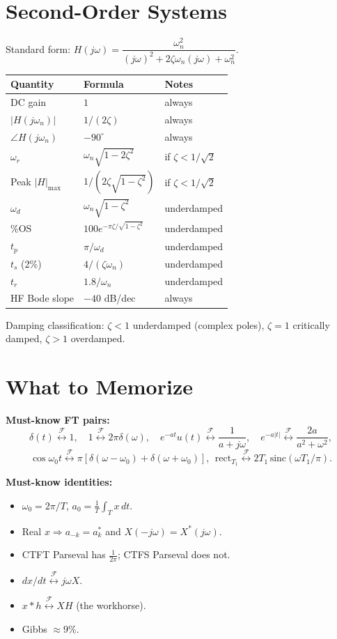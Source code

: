 \documentclass[11pt]{article}
\newcommand{\FT}{\overset{\mathcal{F}}{\longleftrightarrow}}
\begin{document}
\section{Second-Order Systems}

Standard form: $H(j\omega) = \dfrac{\omega_n^2}{(j\omega)^2+2\zeta\omega_n(j\omega)+\omega_n^2}.$

\begin{center}
\begin{tabular}{|l|l|l|}
\hline
Quantity & Formula & Notes\\
\hline
DC gain & $1$ & always\\
$|H(j\omega_n)|$ & $1/(2\zeta)$ & always\\
$\angle H(j\omega_n)$ & $-90^\circ$ & always\\
$\omega_r$ & $\omega_n\sqrt{1-2\zeta^2}$ & if $\zeta<1/\sqrt{2}$\\
Peak $|H|_{\max}$ & $1/(2\zeta\sqrt{1-\zeta^2})$ & if $\zeta<1/\sqrt{2}$\\
$\omega_d$ & $\omega_n\sqrt{1-\zeta^2}$ & underdamped\\
\%OS & $100 e^{-\pi\zeta/\sqrt{1-\zeta^2}}$ & underdamped\\
$t_p$ & $\pi/\omega_d$ & underdamped\\
$t_s$ (2\%) & $4/(\zeta\omega_n)$ & underdamped\\
$t_r$ & $1.8/\omega_n$ & underdamped\\
HF Bode slope & $-40$ dB/dec & always\\
\hline
\end{tabular}
\end{center}

Damping classification: $\zeta<1$ underdamped (complex poles), $\zeta=1$ critically damped, $\zeta>1$ overdamped.

\section{What to Memorize}

\textbf{Must-know FT pairs:}
\[ \delta(t) \FT 1,\quad 1 \FT 2\pi\delta(\omega),\quad e^{-at}u(t) \FT \frac{1}{a+j\omega},\quad e^{-a|t|} \FT \frac{2a}{a^2+\omega^2}, \]
\[ \cos\omega_0 t \FT \pi[\delta(\omega-\omega_0)+\delta(\omega+\omega_0)],\ \ \text{rect}_{T_1} \FT 2T_1\,\text{sinc}(\omega T_1/\pi). \]

\textbf{Must-know identities:}
\begin{itemize}[leftmargin=*]
  \item $\omega_0 = 2\pi/T$, $a_0 = \frac{1}{T}\int_T x\,dt$.
  \item Real $x \Rightarrow a_{-k}=a_k^*$ and $X(-j\omega)=X^*(j\omega)$.
  \item CTFT Parseval has $\frac{1}{2\pi}$; CTFS Parseval does not.
  \item $dx/dt \FT j\omega X$.
  \item $x*h \FT XH$ (the workhorse).
  \item Gibbs $\approx 9\%$.
\end{itemize}
\end{document}
